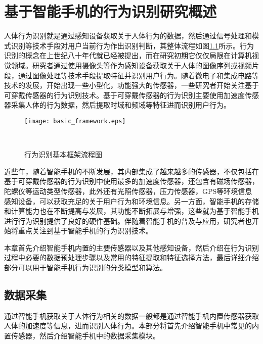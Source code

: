﻿\chapter{基于智能手机的行为识别研究概述}
\par 人体行为识别就是通过感知设备获取关于人体行为的数据，然后通过信号处理和模式识别等技术手段对用户当前行为作出识别判断，其整体流程如图\ref{basic_framework}所示。行为识别的概念在上世纪八十年代就已经被提出，而在研究初期它仅仅局限在计算机视觉领域。研究者通过使用摄像头等作为感知设备获取关于人体的图像序列或视频片段，通过图像处理等技术手段提取特征并识别用户行为。随着微电子和集成电路等技术的发展，开始出现一些小型化，功能强大的传感器，一些研究者开始关注基于可穿戴传感器的行为识别技术。基于可穿戴传感器的行为识别主要使用加速度传感器采集人体的行为数据，然后提取时域和频域等特征进而识别用户行为。

\begin{figure}[htb]
\centering
\texttt{[image: basic\_framework.eps]}
\caption{行为识别基本框架流程图}　\label{basic_framework}
\end{figure}

\par 近些年，随着智能手机的不断发展，其内部集成了越来越多的传感器，不仅包括在基于可穿戴传感器的行为识别中使用最多的加速度传感器，还包含有磁场传感器，陀螺仪等运动类型传感器，此外还有光照传感器，压力传感器，GPS等环境信息感知设备，可以获取充足的关于用户行为和环境信息。另一方面，智能手机的存储和计算能力也在不断提高与发展，其功能不断拓展与增强，这些就为基于智能手机进行行为识别提供了良好的硬件基础。伴随着智能手机的普及与应用，研究者也开始将重点关注到基于智能手机的行为识别技术。
\par 本章首先介绍智能手机内置的主要传感器以及其他感知设备，然后介绍在行为识别过程中必要的数据预处理步骤以及常用的特征提取和特征选择方法，最后详细介绍部分可以用于智能手机行为识别的分类模型和算法。

\section{数据采集}
\par 通过智能手机获取关于人体行为相关的数据一般都是通过智能手机内置传感器获取人体的加速度等信息，进而识别人体行为。本部分将首先介绍智能手机中常见的内置传感器，然后介绍智能手机中的数据采集模块。
